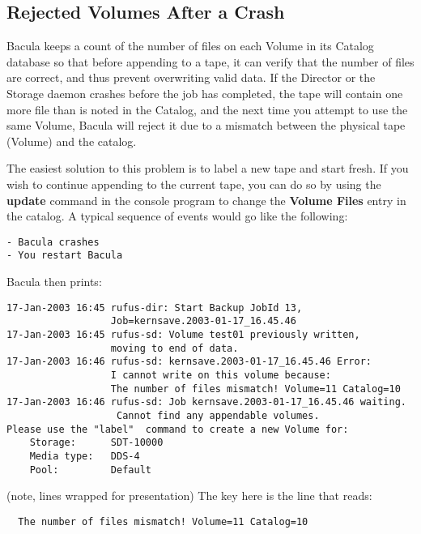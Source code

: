 \subsection*{Rejected Volumes After a Crash}
\label{RejectedVolumes}

Bacula keeps a count of the number of files on each Volume in its Catalog
database so that before appending to a tape, it can verify that the number of
files are correct, and thus prevent overwriting valid data. If the Director or
the Storage daemon crashes before the job has completed, the tape will contain
one more file than is noted in the Catalog, and the next time you attempt to
use the same Volume, Bacula will reject it due to a mismatch between the
physical tape (Volume) and the catalog. 

The easiest solution to this problem is to label a new tape and start fresh.
If you wish to continue appending to the current tape, you can do so by using
the {\bf update} command in the console program to change the {\bf Volume
Files} entry in the catalog. A typical sequence of events would go like the
following: 

\footnotesize
\begin{verbatim}
- Bacula crashes
- You restart Bacula
\end{verbatim}
\normalsize

Bacula then prints: 

\footnotesize
\begin{verbatim}
17-Jan-2003 16:45 rufus-dir: Start Backup JobId 13,
                  Job=kernsave.2003-01-17_16.45.46
17-Jan-2003 16:45 rufus-sd: Volume test01 previously written,
                  moving to end of data.
17-Jan-2003 16:46 rufus-sd: kernsave.2003-01-17_16.45.46 Error:
                  I cannot write on this volume because:
                  The number of files mismatch! Volume=11 Catalog=10
17-Jan-2003 16:46 rufus-sd: Job kernsave.2003-01-17_16.45.46 waiting.
                   Cannot find any appendable volumes.
Please use the "label"  command to create a new Volume for:
    Storage:      SDT-10000
    Media type:   DDS-4
    Pool:         Default
\end{verbatim}
\normalsize

(note, lines wrapped for presentation)
The key here is the line that reads: 

\footnotesize
\begin{verbatim}
  The number of files mismatch! Volume=11 Catalog=10
\end{verbatim}
\normalsize

